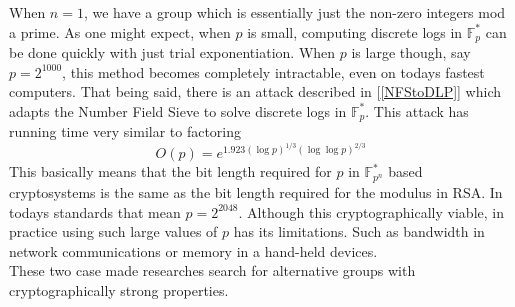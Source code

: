 When $n = 1$, we have a group which is essentially just the non-zero integers mod a prime. As one might expect, when $p$ is small, computing discrete logs in $\mathbb{F}_p^*$ can be done quickly with just trial exponentiation. When $p$ is large though, say $p = 2^{1000}$, this method becomes completely intractable, even on todays fastest computers. That being said, there is an attack described in [\ref{NFStoDLP}] which adapts the Number Field Sieve to solve discrete logs in $\mathbb{F}_p^*$. This attack has running time very similar to factoring $$O(p) = e^{1.923(\log p)^{1/3}(\log\log p)^{2/3}}$$ This basically means that the bit length required for $p$ in $\mathbb{F}_{p^n}^*$ based cryptosystems is the same as the bit length required for the modulus in RSA. In todays standards that mean $p = 2^{2048}$. Although this cryptographically viable, in practice using such large values of $p$ has its limitations. Such as bandwidth in network communications or memory in a hand-held devices. \\

These two case made researches search for alternative groups with cryptographically strong properties. 









